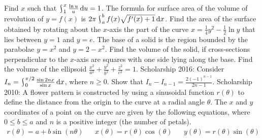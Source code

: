 \begin{questions}
  \questioM Find $ x $ such that $ \rint_1^x \frac{\ln u}{u} \dif{u} = 1 $.
  \questioE The formula for surface area of the volume of revolution of $ y = f(x) $ is $ 2\pi \rint^b_a f(x) \sqrt{f'(x) + 1} \dif{x} $.
            Find the area of the surface obtained by rotating about the $ x$-axis the part of the curve $ x = \frac{1}{4}y^2 - \frac{1}{2}\ln y $
            that lies between $ y = 1 $ and $ y = e $.
  \questioE The base of a solid is the region bounded by the parabolae $ y = x^2 $ and $ y = 2 - x^2 $. Find the volume of the solid,
            if cross-sections perpendicular to the $ x$-axis are squares with one side lying along the base.
  \questioS Find the volume of the ellipsoid $ \frac{x^2}{a^2} + \frac{y^2}{b^2} + \frac{z^2}{c^2} = 1 $.
  \questioO Scholarship 2016: Consider $ I_n = \rint^{\pi/2}_0 \frac{\sin 2nx}{\sin x} \dif{x} $, where $ n \geq 0 $. Show
            that $ I_n - I_{n-1} = \frac{2(-1)^{n-1}}{2n - 1} $.
  \questioS Scholarship 2010:
            A flower pattern is constructed by using a sinusoidal function $ r(\theta) $ to define the distance from the origin to the
            curve at a radial angle $ \theta $. The $ x $ and $ y $ coordinates of a point on the curve are given by the following equations,
            where $ 0 \leq b \leq a $ and $ n $ is a positive integer (the number of petals).
            \begin{align*}
              r(\theta) = a + b \sin (n\theta) && x(\theta) = r(\theta) \cos (\theta) && y(\theta) = r(\theta) \sin(\theta)
            \end{align*}
\end{questions}
